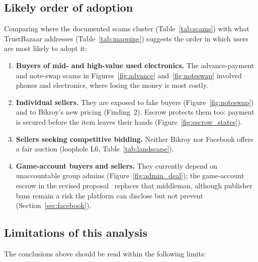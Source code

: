 \subsection{Likely order of adoption}

Comparing where the documented scams cluster (Table~\ref{tab:scams}) with what TrustBazaar
addresses (Table~\ref{tab:mapping}) suggests the order in which users are most likely to adopt
it:

\begin{enumerate}[label=\textbf{\arabic*.}]
  \item \textbf{Buyers of mid- and high-value used electronics.} The advance-payment and
  note-swap scams in Figures~\ref{fig:advance} and~\ref{fig:noteswap} involved phones and
  electronics, where losing the money is most costly.
  \item \textbf{Individual sellers.} They are exposed to fake buyers (Figure~\ref{fig:noteswap})
  and to Bikroy's new pricing (Finding~2). Escrow protects them too: payment is secured before
  the item leaves their hands (Figure~\ref{fig:escrow_states}).
  \item \textbf{Sellers seeking competitive bidding.} Neither Bikroy nor Facebook offers a fair
  auction (loophole L6, Table~\ref{tab:landscape}).
  \item \textbf{Game-account buyers and sellers.} They currently depend on unaccountable group
  admins (Figure~\ref{fig:admin_deal}); the game-account escrow in the revised
  proposal~\cite{proposal_rev} replaces that middleman, although publisher bans remain a risk the
  platform can disclose but not prevent (Section~\ref{sec:facebook}).
\end{enumerate}

\subsection{Limitations of this analysis}

The conclusions above should be read within the following limits:

